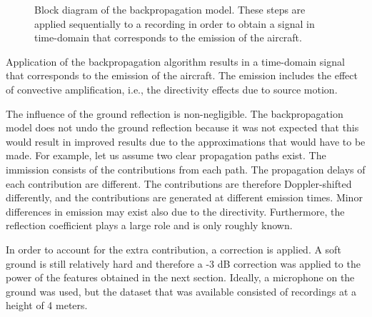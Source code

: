 \begin{figure}[H]
  \centering
{}
  \caption{Block diagram of the backpropagation model. These steps are applied sequentially to a recording in order to obtain a signal in time-domain that corresponds to the emission of the aircraft.}
  \label{fig:backpropagation_block_diagram}
\end{figure}

Application of the backpropagation algorithm results in a time-domain signal
that corresponds to the emission of the aircraft. The emission includes the
effect of convective amplification, i.e., the directivity effects due to source
motion.

The influence of the ground reflection is non-negligible. The backpropagation
model does not undo the ground reflection because it was not expected that this
would result in improved results due to the approximations that would have to be
made. For example, let us assume two clear propagation paths exist. The
immission consists of the contributions from each path. The propagation delays
of each contribution are different. The contributions are therefore
Doppler-shifted differently, and the contributions are generated at different
emission times. Minor differences in emission may exist also due to the
directivity. Furthermore, the reflection coefficient plays a large role and is
only roughly known.

In order to account for the extra contribution, a correction is applied. A soft
ground is still relatively hard and therefore a -3 dB correction was applied to
the power of the features obtained in the next section. Ideally, a microphone on
the ground was used, but the dataset that was available consisted of recordings
at a height of 4 meters.

